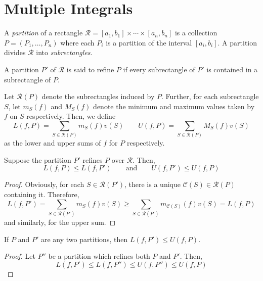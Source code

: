 \section{Multiple Integrals}
\begin{definition}[Partition]
    A \textit{partition} of a rectangle $\mathcal{R} = [a_1,b_1]\times\cdots\times[a_n,b_n]$ is a collection $P = (P_1,\ldots,P_n)$ where each $P_i$ is a partition of the interval $[a_i,b_i]$. A partition divides $\mathcal{R}$ into \textit{subrectangles}.
\end{definition}

\begin{definition}[Refinement]
    A partition $P'$ of $\mathcal{R}$ is said to refine $P$ if every subrectangle of $P'$ is contained in a subrectangle of $P$.
\end{definition}

\begin{definition}
    Let $\mathcal{R}(P)$ denote the subrectangles induced by $P$. Further, for each subrectangle $S$, let $m_S(f)$ and $M_S(f)$ denote the minimum and maximum values taken by $f$ on $S$ respectively. Then, we define 
    \begin{equation*}
        L(f,P) = \sum_{S\in\mathcal{R}(P)}m_S(f)v(S)\qquad U(f,P) = \sum_{S\in\mathcal{R}(P)}M_S(f)v(S)
    \end{equation*}
    as the lower and upper sums of $f$ for $P$ respectively.
\end{definition}

\begin{lemma}
    Suppose the partition $P'$ refines $P$ over $\mathcal{R}$. Then, 
    \begin{equation*}
        L(f,P)\le L(f,P') \qquad\text{and}\qquad U(f,P')\le U(f,P)
    \end{equation*}
\end{lemma}
\begin{proof}
    Obviously, for each $S\in\mathcal{R}(P')$, there is a unique $\mathscr{C}(S)\in\mathcal{R}(P)$ containing it. Therefore, 
    \begin{equation*}
        L(f,P') = \sum_{S\in\mathcal{R}(P')}m_S(f)v(S)\ge\sum_{S\in\mathcal{R}(P')}m_{\mathscr{C}(S)}(f)v(S) = L(f,P)
    \end{equation*}
    and similarly, for the upper sum.
\end{proof}

\begin{corollary}
    If $P$ and $P'$ are any two partitions, then $L(f,P')\le U(f,P)$.
\end{corollary}
\begin{proof}
    Let $P''$ be a partition which refines both $P$ and $P'$. Then, 
    \begin{equation*}
        L(f,P')\le L(f,P'')\le U(f,P'')\le U(f,P)
    \end{equation*}
\end{proof}

